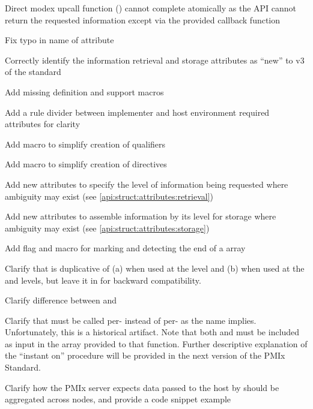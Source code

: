 \begin{compactitemize}
    \item Direct modex upcall function () cannot complete atomically as the \ac{API} cannot return the requested information except via the provided callback function
    \item Fix typo in name of  attribute
    \item Correctly identify the information retrieval and storage attributes as ``new'' to v3 of the standard
    \item Add missing  definition and support macros
    \item Add a rule divider between implementer and host environment required attributes for clarity
    \item Add  macro to simplify creation of  qualifiers
    \item Add  macro to simplify creation of  directives
    \item Add new attributes to specify the level of information being requested where ambiguity may exist (see \ref{api:struct:attributes:retrieval})
    \item Add new attributes to assemble information by its level for storage where ambiguity may exist (see \ref{api:struct:attributes:storage})
    \item Add flag and  macro for marking and detecting the end of a  array
    \item Clarify that  is duplicative of (a)  when used at the  level and (b)  when used at the  and  levels, but leave it in for backward compatibility.
    \item Clarify difference between  and 
    \item Clarify that  must be called per- instead of per- as the name implies. Unfortunately, this is a historical artifact. Note that both  and  must be included as input in the  array provided to that function. Further descriptive explanation of the ``instant on'' procedure will be provided in the next version of the \ac{PMIx} Standard.
    \item Clarify how the \ac{PMIx} server expects data passed to the host by  should be aggregated across nodes, and provide a code snippet example
\end{compactitemize}

